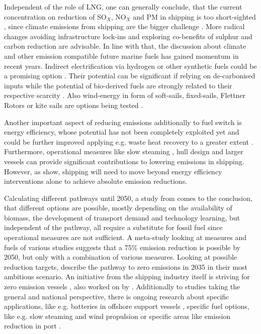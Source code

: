 \documentclass[article]{elsarticle}
\begin{document}
Independent of the role of LNG, one can generally conclude, that the current concentration on reduction of SO$_X$, NO$_X$ and PM in shipping is too short-sighted \cite{Gilbert2014}, since climate emissions from shipping are the bigger challenge \cite{FRIDELL2019}. More radical changes avoiding infrastructure lock-ins and exploring co-benefits of sulphur and carbon reduction are advisable.
In line with that, the discussion about climate and other emission compatible future marine fuels has gained momentum in recent years. Indirect electrification via hydrogen or other synthetic fuels could be a promising option \cite{HORVATH2018}. Their potential can be significant if relying on de-carbonised inputs while the potential of bio-derived fuels are strongly related to their respective scarcity \cite{Gilbert2014}. Also wind-energy in form of soft-sails, fixed-sails, Flettner Rotors or kite sails are options being tested \cite{IRENA2015}.

Another important aspect of reducing emissions additionally to fuel switch is energy efficiency, whose potential has not been completely exploited yet \cite{JAFARZADEH2014,CHI2018} and could be further improved applying e.g. waste heat recovery to a greater extent \cite{Baldi2015}. Furthermore, operational measures like slow steaming \cite{ARMSTRONG2013}, hull design and larger vessels \cite{LINDSTAD2015} can provide significant contributions to lowering emissions in shipping. However, as \citet{Olmer2017} show, shipping will need to move beyond energy efficiency interventions alone to achieve absolute emission reductions.

Calculating different pathways until 2050, a study from \citet{LloydsRegister2016} comes to the conclusion, that different options are possible, mostly depending on the availability of biomass, the development of transport demand and technology learning, but independent of the pathway, all require a substitute for fossil fuel since operational measures are not sufficient. A meta-study looking at measures and fuels of various studies \cite{Bouman2017} suggests that a 75\% emission reduction is possible by 2050, but only with a combination of various measures. Looking at possible reduction targets, \citet{Smith2016} describe the pathway to zero emissions in 2035 in their most ambitious scenario. An initiative from the shipping industry itself is striving for zero emission vessels \cite{SSI2018}, also worked on by \citet{LloydsRegister2017}.
Additionally to studies taking the general and national perspective, there is ongoing research about specific applications, like e.g. batteries in offshore support vessels \cite{Lindstad2017}, specific fuel options, like e.g. slow steaming and wind propulsion \cite{MANDER2017} or specific areas like emission reduction in port \cite{WINNES2015}.
\end{document}
